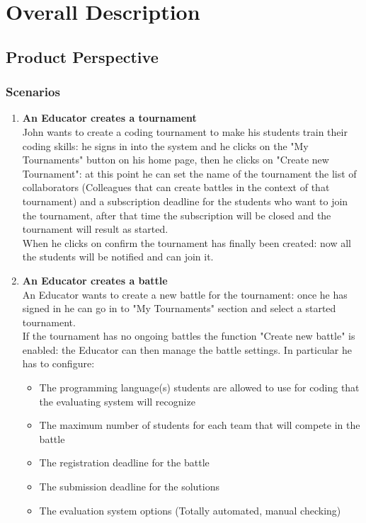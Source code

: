 \documentclass{article}
\begin{document}
\newpage

\section{Overall Description}
\subsection{Product Perspective}
\subsubsection{Scenarios}
\begin{enumerate}
  \item \textbf{An Educator creates a tournament\\}John wants to create a coding tournament to make his students train their
  coding skills: he signs in into the system and he clicks on the "My Tournaments" button on his home page, then he clicks on "Create new Tournament":
  at this point he can set the name of the tournament the list of collaborators (Colleagues that can create battles in the context of that tournament) and a subscription
  deadline for the students who want to join the tournament, after that time the subscription will be closed and the tournament will result as started.\\
  When he clicks on confirm the tournament has finally been created: now all the students will be notified and can join it.\\
  \item \textbf{An Educator creates a battle\\}An Educator wants to create a new battle for the tournament: once he has signed in he can go in to "My Tournaments" section
  and select a started tournament.\\
  If the tournament has no ongoing battles the function "Create new battle" is enabled: the Educator can then manage the battle settings.
  In particular he has to configure:
  \begin{itemize}
    \item The programming language(s) students are allowed to use for coding that the evaluating system will recognize
    \item The maximum number of students for each team that will compete in the battle
    \item The registration deadline for the battle
    \item The submission deadline for the solutions
    \item The evaluation system options (Totally automated, manual checking)

\end{itemize}
\end{enumerate}
\end{document}
